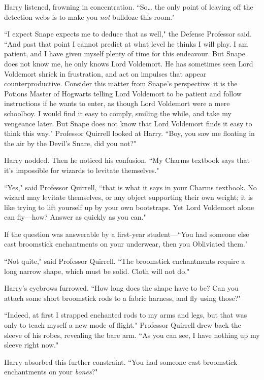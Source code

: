 Harry listened, frowning in concentration. ``So{\ldots} the only point of leaving off the detection webs is to make you \emph{not} bulldoze this room."

``I expect Snape expects me to deduce that as well," the Defense Professor said. ``And past that point I cannot predict at what level he thinks I will play. I am patient, and I have given myself plenty of time for this endeavour. But Snape does not know me, he only knows Lord Voldemort. He has sometimes seen Lord Voldemort shriek in frustration, and act on impulses that appear counterproductive. Consider this matter from Snape's perspective: it is the Potions Master of Hogwarts telling Lord Voldemort to be patient and follow instructions if he wants to enter, as though Lord Voldemort were a mere schoolboy. I would find it easy to comply, smiling the while, and take my vengeance later. But Snape does not know that Lord Voldemort finds it easy to think this way." Professor Quirrell looked at Harry. ``Boy, you saw me floating in the air by the Devil's Snare, did you not?"

Harry nodded. Then he noticed his confusion. ``My Charms textbook says that it's impossible for wizards to levitate themselves."

``Yes," said Professor Quirrell, ``that is what it says in your Charms textbook. No wizard may levitate themselves, or any object supporting their own weight; it is like trying to lift yourself up by your own bootstraps. Yet Lord Voldemort alone can fly—how? Answer as quickly as you can."

If the question was answerable by a first-year student—``You had someone else cast broomstick enchantments on your underwear, then you Obliviated them."

``Not quite," said Professor Quirrell. ``The broomstick enchantments require a long narrow shape, which must be solid. Cloth will not do."

Harry's eyebrows furrowed. ``How long does the shape have to be? Can you attach some short broomstick rods to a fabric harness, and fly using those?"

``Indeed, at first I strapped enchanted rods to my arms and legs, but that was only to teach myself a new mode of flight." Professor Quirrell drew back the sleeve of his robes, revealing the bare arm. ``As you can see, I have nothing up my sleeve right now."

Harry absorbed this further constraint. ``You had someone cast broomstick enchantments on your \emph{bones}?"

